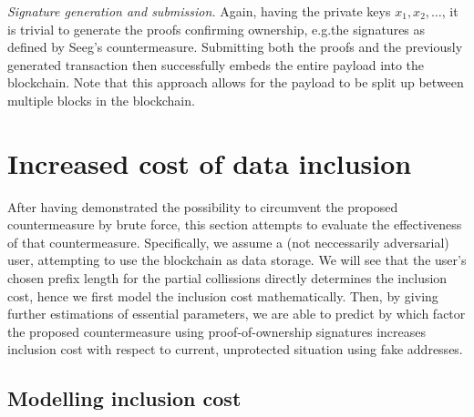 \documentclass[10pt,a4paper,twocolumn]{article}
\begin{document}
\emph{Signature generation and submission.}
Again, having the private keys $x_1, x_2, \dots$, it is trivial to generate the proofs confirming ownership, e.g.\@ the signatures as defined by Seeg's countermeasure.
Submitting both the proofs and the previously generated transaction then successfully embeds the entire payload into the blockchain.
Note that this approach allows for the payload to be split up between multiple blocks in the blockchain.


\section{Increased cost of data inclusion}

After having demonstrated the possibility to circumvent the proposed countermeasure by brute force, this section attempts to evaluate the effectiveness of that countermeasure. 
Specifically, we assume a (not neccessarily adversarial) user, attempting to use the blockchain as data storage.
We will see that the user's chosen prefix length for the partial collissions directly determines the inclusion cost, hence we first model the inclusion cost mathematically. Then, by giving further estimations of essential parameters, we are able to predict by which factor the proposed countermeasure using proof-of-ownership signatures increases inclusion cost with respect to current, unprotected situation using fake addresses. 

\subsection{Modelling inclusion cost}
\end{document}
